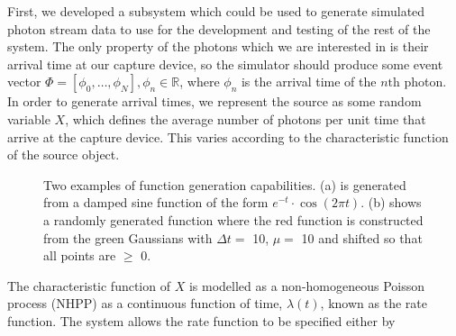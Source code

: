 \documentclass[a4paper,11pt]{article}
\begin{document}
  First, we developed a subsystem which could be used to generate simulated
  photon stream data to use for the development and testing of the rest of the
  system. The only property of the photons which we are interested in is their
  arrival time at our capture device, so the simulator should produce some event
  vector $\Phi=\left[\phi_0,\dots,\phi_N\right], \phi_n \in \mathbb{R}$, where
  $\phi_n$ is the arrival time of the $n\text{th}$ photon. In order to generate
  arrival times, we represent the source as some random variable $X$, which
  defines the average number of photons per unit time that arrive at the capture
  device. This varies according to the characteristic function of the source
  object.
   \begin{figure}

   \caption{Two examples of function generation capabilities. (a) is generated
   from a damped sine function of the form $e^{-t}\cdot \cos(2\pi t)$. (b) shows
   a randomly generated function where the red function is constructed from the
   green Gaussians with $\Delta t=$ 10, $\mu=$ 10 and shifted so that all points
   are $\geq$ 0.}

   \label{fig:contrib}
   \end{figure}
  The characteristic function of $X$ is modelled as a non-homogeneous Poisson
  process (NHPP) as a continuous function of time, $\lambda(t)$, known as the
  rate function. The system allows the rate function to be specified either by
\end{document}

